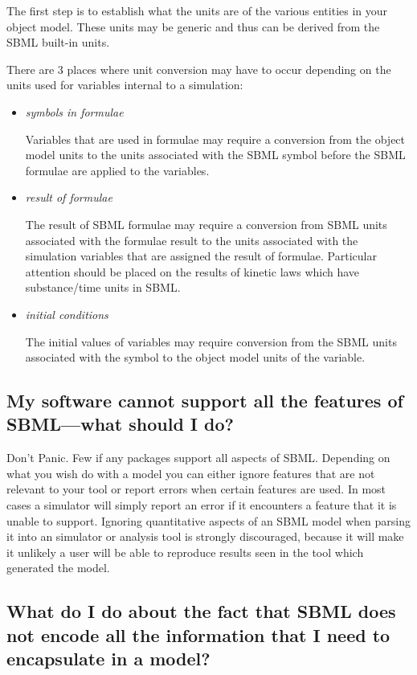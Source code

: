 \documentclass{sbmlfaq}
\begin{document}
The first step is to establish what the units are of the various entities in your object model.
These units may be generic and thus can be derived from the SBML built-in units.

There are 3 places where unit conversion may have to occur depending on the units used for variables internal to a simulation:

\begin{itemize}

\item \emph{symbols in formulae}

Variables that are used in formulae may require a conversion from the object model units to the units associated with the SBML symbol
before the SBML formulae are applied to the variables.  

\item \emph{result of formulae}

The result of SBML formulae may require a conversion from SBML units associated with the formulae result to the units associated
with the simulation variables that are assigned the result of formulae.  Particular attention should be placed on the
results of kinetic laws which have substance/time units in SBML.

\item \emph{initial conditions}

The initial values of variables may require conversion from the SBML units associated with the symbol to the object model units of
the variable.

\end{itemize}

\subsection{My software cannot support all the features of SBML---what should I do?}

Don't Panic.  Few if any packages support all aspects of SBML.  Depending
on what you wish do with a model you can either ignore features that are
not relevant to your tool or report errors when certain features are used.
In most cases a simulator will simply report an error if it encounters a
feature that it is unable to support.  Ignoring quantitative aspects of an
SBML model when parsing it into an simulator or analysis tool is strongly
discouraged, because it will make it unlikely a user will be able to
reproduce results seen in the tool which generated the model.


\subsection{What do I do about the fact that SBML does not encode all the
  information that I need to encapsulate in a model?}
\end{document}
